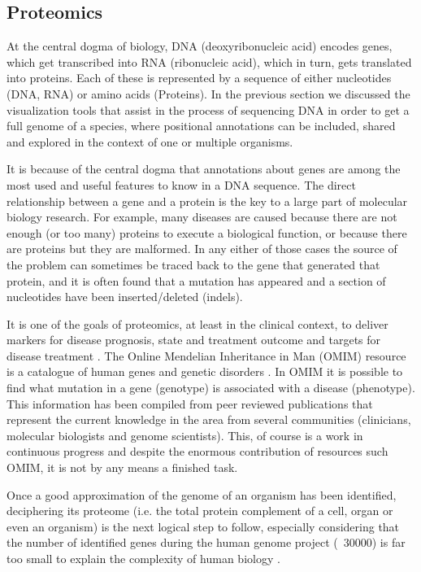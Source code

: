 \subsection{Proteomics}
At the central dogma of biology, DNA (deoxyribonucleic acid) encodes genes, which get transcribed into RNA (ribonucleic acid), which in turn, gets translated into proteins. Each of these is represented by a sequence of either nucleotides (DNA, RNA) or amino acids (Proteins). In the previous section we discussed the visualization tools that assist in the process of sequencing DNA in order to get a full genome of a species, where positional annotations can be included, shared and explored in the context of one or multiple organisms. 

It is because of the central dogma that annotations about genes are among the most used and useful features to know in a DNA sequence. The direct relationship between a gene and a protein is the key to a large part of molecular biology research. For example, many diseases are caused because there are not enough (or too many) proteins to execute a biological function, or because there are proteins but they are malformed. In any either of those cases the source of the problem can sometimes be traced back to the gene that generated that protein, and it is often found that a mutation has appeared and a section of nucleotides have been inserted/deleted (indels). 

It is one of the goals of proteomics, at least in the clinical context, to deliver markers for disease prognosis, state and treatment outcome and targets for disease treatment \cite{MIS2007}. The Online Mendelian Inheritance in Man (OMIM) resource is a catalogue of human genes and genetic disorders \cite{AMB2014}. In OMIM it is possible to find what mutation in a gene (genotype) is associated with a disease (phenotype). This information has been compiled from peer reviewed publications that represent the current knowledge in the area from several communities (clinicians, molecular biologists and genome scientists). This, of course is a work in continuous progress and despite the enormous contribution of resources such OMIM, it is not by any means a finished task.

Once a good approximation of the genome of an organism has been identified, deciphering its proteome (i.e. the total protein complement of a cell, organ or even an organism) is the next logical step to follow, especially considering that the number of identified genes during the human genome project (~30000) is far too small to explain the complexity of human biology \cite{PAN2008}.

